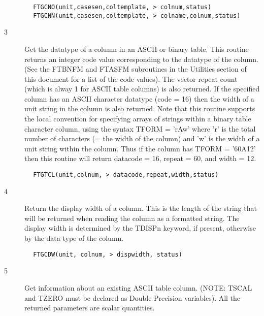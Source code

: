 \documentclass[11pt]{book}
\begin{document}
\begin{verbatim}
        FTGCNO(unit,casesen,coltemplate, > colnum,status)
        FTGCNN(unit,casesen,coltemplate, > colname,colnum,status)
\end{verbatim}

\begin{description}
\item[3 ] Get the datatype of a column in an ASCII or binary table.  This
    routine returns an integer code value corresponding to the datatype
    of the column. (See the FTBNFM and FTASFM subroutines in the Utilities
    section of this document for a list of the code values).  The vector
    repeat count (which is alway 1 for ASCII table columns) is also returned.
    If the specified column has an ASCII character datatype (code = 16) then
    the width of a unit string in the column is also returned.  Note that
    this routine supports the local convention for specifying arrays of
    strings within a binary table character column, using the syntax
    TFORM = 'rAw' where 'r' is the total number of characters (= the width
    of the column) and 'w' is the width of a unit string within the column.
    Thus if the column has TFORM = '60A12' then this routine will return
   datacode = 16, repeat = 60, and width = 12.
\end{description}

\begin{verbatim}
        FTGTCL(unit,colnum, > datacode,repeat,width,status)
\end{verbatim}

\begin{description}
\item[4 ] Return the display width of a column.  This is the length
    of the string that will be returned
    when reading the column as a formatted string.  The display width is
    determined by the TDISPn keyword, if present, otherwise by the data
   type of the column.
\end{description}

\begin{verbatim}
        FTGCDW(unit, colnum, > dispwidth, status)
\end{verbatim}

\begin{description}
\item[5 ] Get information about an existing ASCII table column.  (NOTE: TSCAL and
    TZERO must be declared as Double Precision variables).  All the
   returned parameters are scalar quantities.
\end{description}
\end{document}
